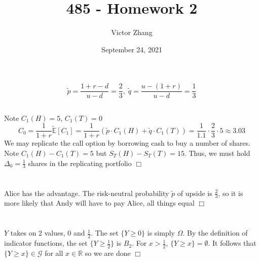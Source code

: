 \documentclass{article}
\title{485 - Homework 2}
\author{Victor Zhang}
\date{September 24, 2021}
\begin{document}
\maketitle

\section{}
\subsection{}
$$\tilde{p} = \frac{1 + r - d}{u - d} = \frac{2}{3},\; \tilde{q} = \frac{u - (1 + r)}{u - d} = \frac{1}{3}$$

\subsection{}
Note $C_1(H) = 5$, $C_1(T) = 0$
$$C_0 = \frac{1}{1+r} \widetilde{\mathbb{E}}[C_1] = \frac{1}{1+r} \left( \tilde{p} \cdot C_1(H) + \tilde{q} \cdot C_1(T) \right) = \frac{1}{1.1} \cdot \frac{2}{3} \cdot 5 \approx 3.03$$
We may replicate the call option by borrowing cash to buy a number of shares. Note $C_1(H) - C_1(T) = 5$ but $S_T(H) - S_T(T) = 15$. Thus, we must hold $\Delta_0 = \frac{1}{3}$ shares in the replicating portfolio $\Box$

\section{}
Alice has the advantage. The risk-neutral probability $\tilde{p}$ of upside is $\tfrac{2}{3}$, so it is more likely that Andy will have to pay Alice, all things equal $\Box$

\section{}
\subsection{}
$Y$ takes on 2 values, 0 and $\tfrac{1}{2}$. The set $\{Y \geq 0\}$ is simply $\Omega$. By the definition of indicator functions, the set $\{Y \geq \frac{1}{2}\}$ is $B_2$. For $x > \frac{1}{2}$, $\{Y \geq x\} = \emptyset$. It follows that $\{Y \geq x\} \in \mathcal{G}$ for all $x \in \mathbb{R}$ so we are done $\Box$
\end{document}

